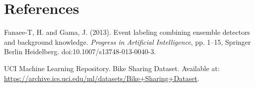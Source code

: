 \documentclass[12pt]{article}
\begin{document}
\section{References}

\small
\noindent [1] Fanaee-T, H. and Gama, J. (2013). Event labeling combining ensemble detectors and background knowledge. \textit{Progress in Artificial Intelligence}, pp. 1--15, Springer Berlin Heidelberg. doi:10.1007/s13748-013-0040-3.

\noindent [2] UCI Machine Learning Repository. Bike Sharing Dataset. Available at: \url{https://archive.ics.uci.edu/ml/datasets/Bike+Sharing+Dataset}.
\end{document}
